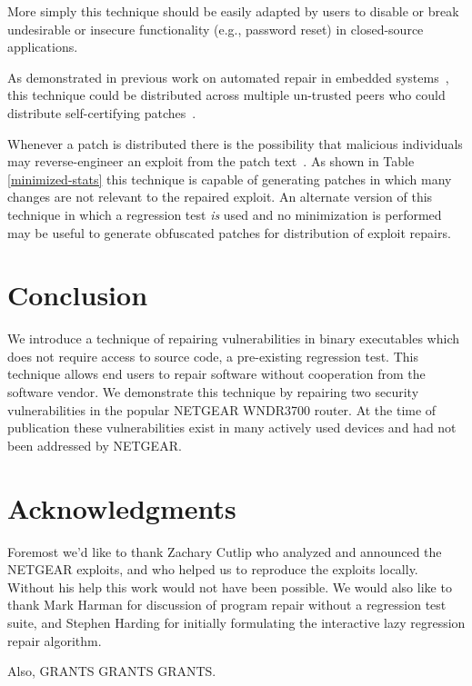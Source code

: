 \documentclass{sigcomm-alternate}
\begin{document}
More simply this technique should be easily adapted by users to
disable or break undesirable or insecure functionality (e.g., password
reset) in closed-source applications.

As demonstrated in previous work on automated repair in embedded
systems~\cite{schulte2013embedded}, this technique could be
distributed across multiple un-trusted peers who could distribute
self-certifying patches~\cite{costa2008vigilante}.

Whenever a patch is distributed there is the possibility that
malicious individuals may reverse-engineer an exploit from the patch
text~\cite{brumley2008automatic}.  As shown in Table
\ref{minimized-stats} this technique is capable of generating patches
in which many changes are not relevant to the repaired exploit.  An
alternate version of this technique in which a regression test
\emph{is} used and no minimization is performed may be useful to
generate obfuscated patches for distribution of exploit repairs.

\section{Conclusion}

We introduce a technique of repairing vulnerabilities in binary
executables which does not require access to source code, a
pre-existing regression test.  This technique allows end users to
repair software without cooperation from the software vendor.  We
demonstrate this technique by repairing two security vulnerabilities
in the popular NETGEAR WNDR3700 router.  At the time of publication
these vulnerabilities exist in many actively used devices and had not
been addressed by NETGEAR.

\section{Acknowledgments}
\label{sec-7}
Foremost we'd like to thank Zachary Cutlip who analyzed and announced
the NETGEAR exploits, and who helped us to reproduce the exploits
locally.  Without his help this work would not have been possible.  We
would also like to thank Mark Harman for discussion of program repair
without a regression test suite, and Stephen Harding for initially
formulating the interactive lazy regression repair algorithm.

Also, GRANTS GRANTS GRANTS.



\end{document}
